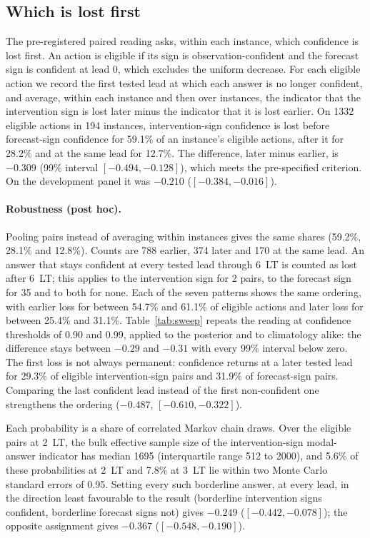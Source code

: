 \documentclass[11pt]{article}
\begin{document}
\subsection{Which is lost first}
\label{sec:order}
The pre-registered paired reading asks, within each instance, which confidence is lost first. An action is eligible if its sign is observation-confident and the forecast sign is confident at lead 0, which excludes the uniform decrease. For each eligible action we record the first tested lead at which each answer is no longer confident, and average, within each instance and then over instances, the indicator that the intervention sign is lost later minus the indicator that it is lost earlier. On 1332 eligible actions in 194 instances, intervention-sign confidence is lost before forecast-sign confidence for 59.1\% of an instance's eligible actions, after it for 28.2\% and at the same lead for 12.7\%. The difference, later minus earlier, is $-0.309$ (99\% interval $[-0.494, -0.128]$), which meets the pre-specified criterion. On the development panel it was $-0.210$ ($[-0.384, -0.016]$).

\paragraph{Robustness (post hoc).} Pooling pairs instead of averaging within instances gives the same shares (59.2\%, 28.1\% and 12.8\%). Counts are 788 earlier, 374 later and 170 at the same lead. An answer that stays confident at every tested lead through 6~LT is counted as lost after 6~LT; this applies to the intervention sign for 2 pairs, to the forecast sign for 35 and to both for none. Each of the seven patterns shows the same ordering, with earlier loss for between 54.7\% and 61.1\% of eligible actions and later loss for between 25.4\% and 31.1\%. Table~\ref{tab:sweep} repeats the reading at confidence thresholds of 0.90 and 0.99, applied to the posterior and to climatology alike: the difference stays between $-0.29$ and $-0.31$ with every 99\% interval below zero. The first loss is not always permanent: confidence returns at a later tested lead for 29.3\% of eligible intervention-sign pairs and 31.9\% of forecast-sign pairs. Comparing the last confident lead instead of the first non-confident one strengthens the ordering ($-0.487$, $[-0.610, -0.322]$).

Each probability is a share of correlated Markov chain draws. Over the eligible pairs at 2~LT, the bulk effective sample size of the intervention-sign modal-answer indicator has median 1695 (interquartile range 512 to 2000), and 5.6\% of these probabilities at 2~LT and 7.8\% at 3~LT lie within two Monte Carlo standard errors of 0.95. Setting every such borderline answer, at every lead, in the direction least favourable to the result (borderline intervention signs confident, borderline forecast signs not) gives $-0.249$ ($[-0.442, -0.078]$); the opposite assignment gives $-0.367$ ($[-0.548, -0.190]$).
\end{document}
